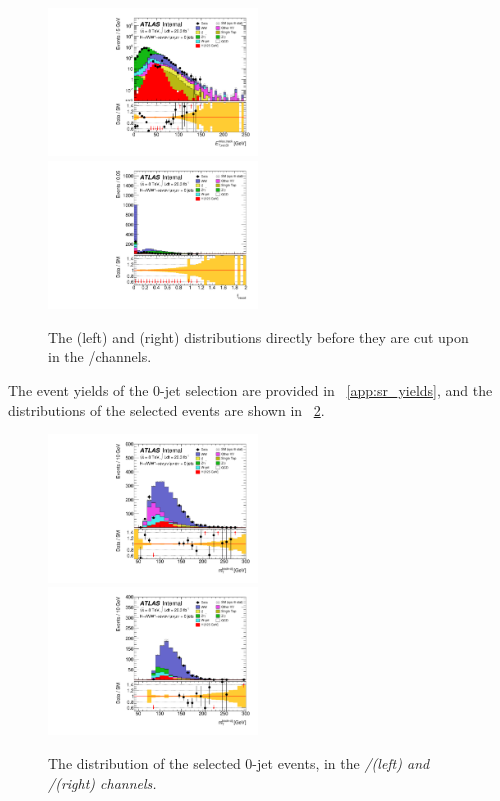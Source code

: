 \begin{figure}
	\includegraphics[width=0.495\textwidth]{tex/selection/eemm_CutTopoMll_0jet_METRel_TrackHWW_Clj_mh125_log}
	\hfill
	\includegraphics[width=0.495\textwidth]{tex/selection/eemm_CutTopoDPhill_0jet_f_recoil_mh125_lin}
	\caption{The \corrtrackmetrel (left) and \frecoil (right) distributions directly 
	before they are cut upon in the \ee/\mm channels.}
	\label{fig:sel:0j:sf_cuts}
\end{figure}

The event yields of the 0-jet selection are provided in \Appendix~\ref{app:sr_yields}, 
and the \mt distributions of the selected events are shown in \Figure~\ref{fig:sel:0j:mt}.

\begin{figure}
	\includegraphics[width=0.495\textwidth]{tex/selection/emme_CutFRecoil_0jet_MT_TrackHWW_Clj_mh125_lin}
	\hfill
	\includegraphics[width=0.495\textwidth]{tex/selection/eemm_CutFRecoil_0jet_MT_TrackHWW_Clj_mh125_lin}
	\caption{The \mt distribution of the selected 0-jet events, in the \em/\me (left) and 
	\ee/\mm (right) channels.}
	\label{fig:sel:0j:mt}
\end{figure}



